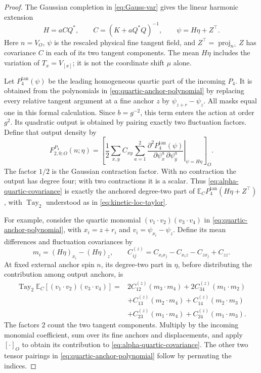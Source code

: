\documentclass[11pt]{article}
\newcommand{\E}{\mathbb E}
\newcommand{\proj}{\operatorname{proj}}
\newcommand{\Tay}{\operatorname{Tay}}
\numberwithin{equation}{section}
\theoremstyle{definition}
\theoremstyle{plain}
\begin{document}
\begin{proof}
The Gaussian completion
in \eqref{eq:Gauss-var} gives the linear harmonic extension
\begin{equation}
 H=aCQ^*,\qquad C=(K+aQ^*Q)^{-1},\qquad
 \psi=H\eta+Z^\top.
 \label{eq:alpha-harmonic-extension}
\end{equation}
Here $n=V_O$, $\psi$ is the rescaled physical fine tangent field, and
$Z^\top=\proj_{n^\perp}Z$ has covariance $C$ in each of its two
tangent components.  The mean $H\eta$ includes the variation of
$T_x=V_{[x]}$; it is not the coordinate shift $\mu$ alone.

Let $P_4^{\mathrm{tan}}(\psi)$ be the leading homogeneous quartic
part of the incoming $P_4$.  It is obtained from the polynomials
in \eqref{eq:quartic-anchor-polynomial} by replacing every
relative tangent argument at a fine anchor $z$ by
$\psi_{z+r}-\psi_z$.  All masks equal one in this formal
calculation.  Since $b=g^{-2}$, this term enters the action at
order $g^2$.  Its quadratic output is obtained by pairing exactly
two fluctuation factors.  Define that output density by
\begin{equation}
 F_{2,0;O}^{P_4}(n;\eta)
 =\left[
   \left.\frac12\sum_{x,y}C_{xy}\sum_{a=1}^2
       \frac{\partial^2P_4^{\mathrm{tan}}(\psi)}
            {\partial\psi_x^a\,\partial\psi_y^a}
   \right|_{\psi=H\eta}
  \right]_O.
 \label{eq:alpha-quartic-covariance}
\end{equation}
The factor $1/2$ is the Gaussian contraction factor.  With no
contraction the output has degree four; with two contractions it
is a scalar.  Thus \eqref{eq:alpha-quartic-covariance} is exactly
the anchored degree-two part of
$\E_C P_4^{\mathrm{tan}}(H\eta+Z^\top)$, with $\Tay_2$ understood
as in \eqref{eq:kinetic-loc-taylor}.

For example, consider the quartic monomial
$(v_1\cdot v_2)(v_3\cdot v_4)$ in
\eqref{eq:quartic-anchor-polynomial}, with $x_i=z+r_i$ and
$v_i=\psi_{x_i}-\psi_z$.  Define its mean differences and
fluctuation covariances by
\begin{equation}
 m_i=(H\eta)_{x_i}-(H\eta)_z,\qquad
 C^{(z)}_{ij}=C_{x_i x_j}-C_{x_i z}-C_{z x_j}+C_{zz}.
\end{equation}
At fixed external anchor spin $n$, its degree-two part in
$\eta$, before distributing the contribution among output
anchors, is
\begin{equation}
 \begin{aligned}
 \Tay_2\E_C[(v_1\cdot v_2)(v_3\cdot v_4)]
 ={}&2C^{(z)}_{12}(m_3\cdot m_4)+2C^{(z)}_{34}(m_1\cdot m_2)\\
 &+C^{(z)}_{13}(m_2\cdot m_4)+C^{(z)}_{14}(m_2\cdot m_3)\\
 &+C^{(z)}_{23}(m_1\cdot m_4)+C^{(z)}_{24}(m_1\cdot m_3).
 \end{aligned}
\end{equation}
The factors $2$ count the two tangent components.  Multiply by
the incoming monomial coefficient, sum over its fine anchors
and displacements, and apply $[\cdot]_O$ to obtain its contribution
to \eqref{eq:alpha-quartic-covariance}.  The other two tensor
pairings in \eqref{eq:quartic-anchor-polynomial} follow by
permuting the indices.


\end{proof}
\end{document}
